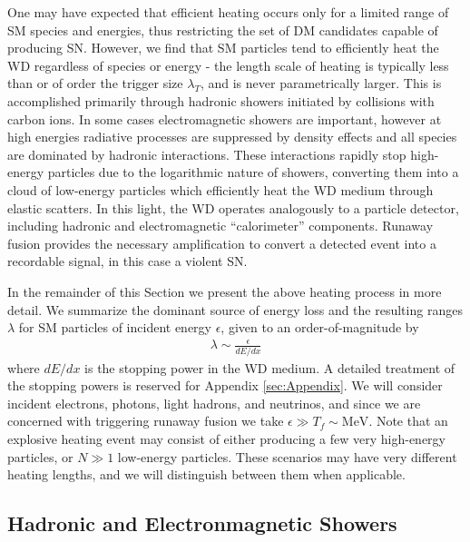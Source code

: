 \documentclass[twocolumn, preprintnumbers,amsmath,amssymb,prd, superscriptaddress]{revtex4}
\begin{document}
One may have expected that efficient heating occurs only for a limited range of SM species and energies, thus restricting the set of DM candidates capable of producing SN.
However, we find that SM particles tend to efficiently heat the WD regardless of species or energy - the length scale of heating is typically less than or of order the trigger size $\lambda_T$, and is never parametrically larger.
This is accomplished primarily through hadronic showers initiated by collisions with carbon ions.
In some cases electromagnetic showers are important, however at high energies radiative processes are suppressed by density effects and all species are dominated by hadronic interactions. 
These interactions rapidly stop high-energy particles due to the logarithmic nature of showers, converting them into a cloud of low-energy particles which efficiently heat the WD medium through elastic scatters.
In this light, the WD operates analogously to a particle detector, including hadronic and electromagnetic ``calorimeter'' components.
Runaway fusion provides the necessary amplification to convert a detected event into a recordable signal, in this case a violent SN.

In the remainder of this Section we present the above heating process in more detail.
We summarize the dominant source of energy loss and the resulting ranges $\lambda$ for SM particles of incident energy $\epsilon$, given to an order-of-magnitude by
\begin{align}
    \lambda \sim \frac{\epsilon}{dE/dx}
\end{align}
where $dE/dx$ is the stopping power in the WD medium.
A detailed treatment of the stopping powers is reserved for Appendix \ref{sec:Appendix}.
We will consider incident electrons, photons, light hadrons, and neutrinos, and since we are concerned with triggering runaway fusion we take $\epsilon \gg T_f \sim \text{MeV}$.
Note that an explosive heating event may consist of either producing a few very high-energy particles, or $N \gg 1$ low-energy particles.
These scenarios may have very different heating lengths, and we will distinguish between them when applicable.

\subsection{Hadronic and Electronmagnetic Showers}
\end{document}

